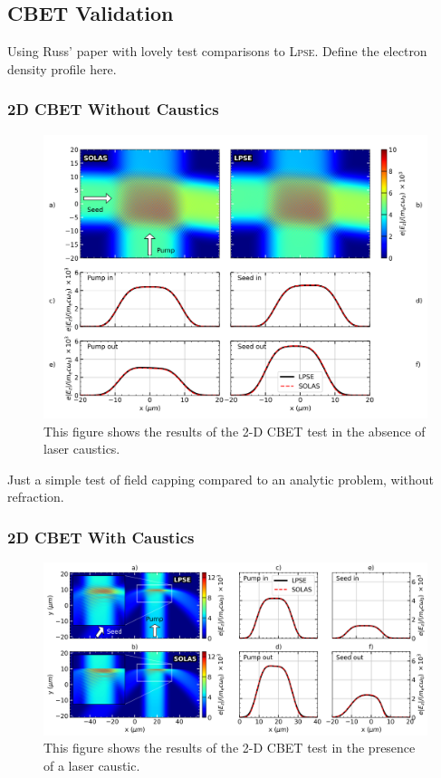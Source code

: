 \subsection{CBET Validation}
Using Russ' paper with lovely test comparisons to \textsc{Lpse}.
Define the electron density profile here.

\subsubsection{2D CBET Without Caustics}

\begin{figure}[t!]
    \includegraphics[width=1.0\linewidth]{Numerics/Images/CBET_test_nocaustics.png}
    \centering
    \caption{This figure shows the results of the 2-D \ac{CBET} test in the absence of laser caustics.}%
    \label{fig:SOLAS_CBET_test_nocaustics}
\end{figure}

Just a simple test of field capping compared to an analytic problem, without refraction.

\subsubsection{2D CBET With Caustics}%
\label{sec:SOLAS_CBET_caustic_test}

\begin{figure}[t!]
    \includegraphics[width=1.0\linewidth]{Numerics/Images/caustic_CBET_test.png}
    \centering
    \caption{This figure shows the results of the 2-D \ac{CBET} test in the presence of a laser caustic.}%
    \label{fig:SOLAS_CBET_test_caustics}
\end{figure}

